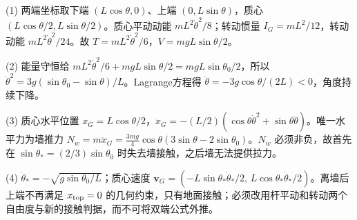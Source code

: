 (1) 两端坐标取下端 \((L\cos\theta,0)\)、上端 \((0,L\sin\theta)\)，质心 \((L\cos\theta/2,L\sin\theta/2)\)。质心平动动能 \(mL^2\dot\theta^2/8\)；转动惯量 \(I_G=mL^2/12\)，转动动能 \(mL^2\dot\theta^2/24\)。故 \(T=mL^2\dot\theta^2/6\)，\(V=mgL\sin\theta/2\)。

(2) 能量守恒给 \(mL^2\dot\theta^2/6+mgL\sin\theta/2=mgL\sin\theta_0/2\)，所以 \(\dot\theta^2=3g(\sin\theta_0-\sin\theta)/L\)。Lagrange方程得 \(\ddot\theta=-3g\cos\theta/(2L)<0\)，角度持续下降。

(3) 质心水平位置 \(x_G=L\cos\theta/2\)，\(\ddot x_G=-(L/2)(\cos\theta\dot\theta^2+\sin\theta\ddot\theta)\)。唯一水平力为墙推力 \(N_w=m\ddot x_G=\frac{3mg}{4}\cos\theta(3\sin\theta-2\sin\theta_0)\)。\(N_w\) 必须非负，故首先在 \(\sin\theta_*=(2/3)\sin\theta_0\) 时失去墙接触，之后墙无法提供拉力。

(4) \(\dot\theta_*=-\sqrt{g\sin\theta_0/L}\)；质心速度 \(\mathbf v_G=(-L\sin\theta_*\dot\theta_*/2,\,L\cos\theta_*\dot\theta_*/2)\)。离墙后上端不再满足 \(x_{\rm top}=0\) 的几何约束，只有地面接触；必须改用杆平动和转动两个自由度与新的接触判据，而不可将双端公式外推。

